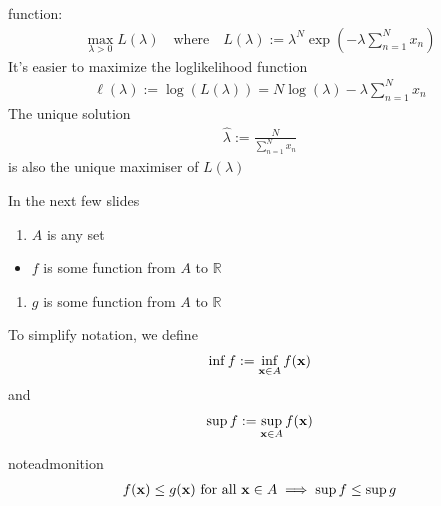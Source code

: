 \documentclass[letterpaper,10pt,english]{jupyterBook}
\begin{document}
\sphinxAtStartPar
function:
\begin{equation*}
\begin{split}
%
\max_{\lambda > 0} L(\lambda)
\quad \text{where} \quad
L(\lambda) 
:= \lambda^N \exp \left(-\lambda \sum_{n=1}^N x_n \right)
%
\end{split}
\end{equation*}
\sphinxAtStartPar
It’s easier to maximize the log\sphinxhyphen{}likelihood function
\begin{equation*}
\begin{split}
%
\ell(\lambda) 
:= \log(L(\lambda))
= N \log(\lambda) - \lambda \sum_{n=1}^N x_n 
%
\end{split}
\end{equation*}
\sphinxAtStartPar
The unique solution
\begin{equation*}
\begin{split}
%
\hat \lambda := \frac{N}{\sum_{n=1}^N x_n}
%
\end{split}
\end{equation*}
\sphinxAtStartPar
is also the unique maximiser of \(L(\lambda)\)

\sphinxAtStartPar
In the next few slides
\begin{enumerate}
%
\item {} 
\sphinxAtStartPar
\(A\) is any set

\end{enumerate}
\begin{itemize}
\item {} 
\sphinxAtStartPar
\(f\) is some function from \(A\) to \(\mathbb{R}\)

\end{itemize}
\begin{enumerate}
%
\setcounter{enumi}{8}
\item {} 
\sphinxAtStartPar
\(g\) is some function from \(A\) to \(\mathbb{R}\)

\end{enumerate}

\sphinxAtStartPar
To simplify notation, we define
\begin{equation*}
\begin{split}
%
\inf f 
:= \inf_{{\bf x} \in A} f({\bf x}) 
%
\end{split}
\end{equation*}
\sphinxAtStartPar
and
\begin{equation*}
\begin{split}
%
\sup f 
:= \sup_{{\bf x} \in A} f({\bf x}) 
%
\end{split}
\end{equation*}
\begin{sphinxadmonition}{note}{admonition}
\begin{equation*}
\begin{split}
%
f({\bf x}) \leq g({\bf x}) \text{ for all } {\bf x} \in A
\implies
\sup f \leq \sup g
%
\end{split}
\end{equation*}\end{sphinxadmonition}
\end{document}
